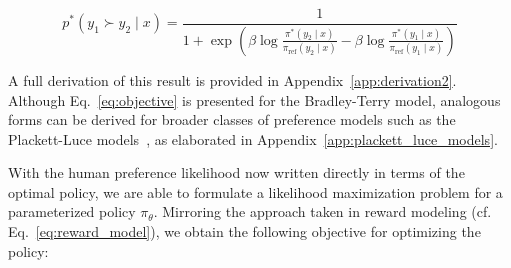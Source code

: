 \begin{equation}\label{eq:objective}
    p^*(y_1\succ y_2 \mid x)=\frac{1}{1 + \exp\left(\beta \log \frac{\pi^*(y_2\mid x)}{\pi_\text{ref}(y_2\mid x)} - \beta \log \frac{\pi^*(y_1\mid x)}{\pi_\text{ref}(y_1\mid x)}\right)}
\end{equation}

A full derivation of this result is provided in Appendix~\ref{app:derivation2}. Although Eq.~\ref{eq:objective} is presented for the Bradley-Terry model, analogous forms can be derived for broader classes of preference models such as the Plackett-Luce models~\citep{plackett1975analysis, luce2012individual}, as elaborated in Appendix~\ref{app:plackett_luce_models}.

With the human preference likelihood now written directly in terms of the optimal policy, we are able to formulate a likelihood maximization problem for a parameterized policy $\pi_\theta$. Mirroring the approach taken in reward modeling (cf. Eq.~\ref{eq:reward_model}), we obtain the following objective for optimizing the policy:

